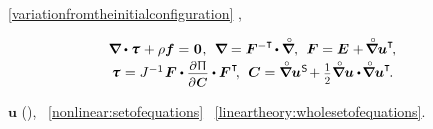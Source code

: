 ~\eqref{variationfromtheinitialconfiguration}
,

\nopagebreak\vspace{-0.25em}
\begin{equation}\label{nonlinear:setofequations}
\begin{array}{c}
\boldnabla \dotp \cauchystress \hspace{.15ex} + \rho \massloadvector = \hspace{.1ex} \zerovector \hspace{.1ex},
\:\:
\boldnabla = \bm{F}^{-\T} \hspace{-0.2ex} \dotp \boldnablacircled ,
\:\:
\bm{F} = \UnitDyad \hspace{.1ex} + \hspace{-0.2ex} \boldnablacircled {\bm{u}}^{\T} \hspace{-0.3ex},
\\[.2em]
%
\cauchystress \hspace{.1ex} = J^{-1} \hspace{.2ex} \bm{F} \dotp \scalebox{0.9}{$ \displaystyle \frac{\raisemath{-0.125em}{\partial\hspace{.1ex} \potentialenergydensity}}{\raisemath{-0.1em}{\partial\hspace{.1ex} \bm{C}}} $} \dotp \bm{F}^{\hspace{.1ex}\T} \hspace{-0.4ex},
\:\:
\bm{C} = \boldnablacircled {\bm{u}}^{\hspace{.1ex}\mathsf{S}} \hspace{-0.3ex} + \smalldisplaystyleonehalf \boldnablacircled \bm{u} \dotp \hspace{-0.25ex} \boldnablacircled \bm{u}^{\T} \hspace{-0.25ex}.
\end{array}
\end{equation}

\vspace{-0.1em}\noindent
{}
~$\bm{u}$
(),
~\eqref{nonlinear:setofequations}
~\eqref{lineartheory:wholesetofequations}.

